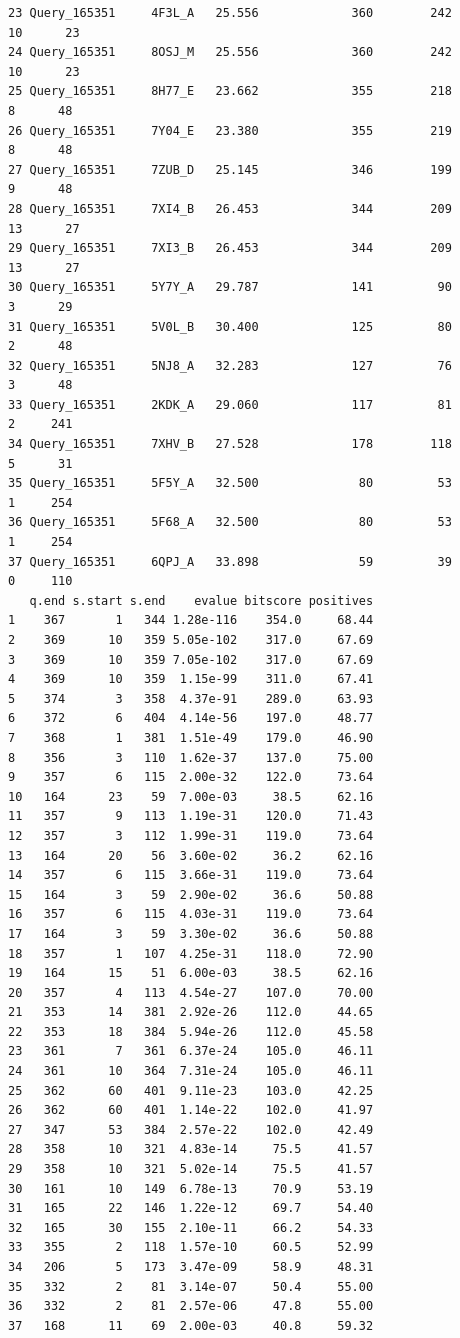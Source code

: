 \documentclass[
  letterpaper,
  DIV=11,
  numbers=noendperiod]{scrartcl}
\begin{document}
\begin{verbatim}
23 Query_165351     4F3L_A   25.556             360        242       10      23
24 Query_165351     8OSJ_M   25.556             360        242       10      23
25 Query_165351     8H77_E   23.662             355        218        8      48
26 Query_165351     7Y04_E   23.380             355        219        8      48
27 Query_165351     7ZUB_D   25.145             346        199        9      48
28 Query_165351     7XI4_B   26.453             344        209       13      27
29 Query_165351     7XI3_B   26.453             344        209       13      27
30 Query_165351     5Y7Y_A   29.787             141         90        3      29
31 Query_165351     5V0L_B   30.400             125         80        2      48
32 Query_165351     5NJ8_A   32.283             127         76        3      48
33 Query_165351     2KDK_A   29.060             117         81        2     241
34 Query_165351     7XHV_B   27.528             178        118        5      31
35 Query_165351     5F5Y_A   32.500              80         53        1     254
36 Query_165351     5F68_A   32.500              80         53        1     254
37 Query_165351     6QPJ_A   33.898              59         39        0     110
   q.end s.start s.end    evalue bitscore positives
1    367       1   344 1.28e-116    354.0     68.44
2    369      10   359 5.05e-102    317.0     67.69
3    369      10   359 7.05e-102    317.0     67.69
4    369      10   359  1.15e-99    311.0     67.41
5    374       3   358  4.37e-91    289.0     63.93
6    372       6   404  4.14e-56    197.0     48.77
7    368       1   381  1.51e-49    179.0     46.90
8    356       3   110  1.62e-37    137.0     75.00
9    357       6   115  2.00e-32    122.0     73.64
10   164      23    59  7.00e-03     38.5     62.16
11   357       9   113  1.19e-31    120.0     71.43
12   357       3   112  1.99e-31    119.0     73.64
13   164      20    56  3.60e-02     36.2     62.16
14   357       6   115  3.66e-31    119.0     73.64
15   164       3    59  2.90e-02     36.6     50.88
16   357       6   115  4.03e-31    119.0     73.64
17   164       3    59  3.30e-02     36.6     50.88
18   357       1   107  4.25e-31    118.0     72.90
19   164      15    51  6.00e-03     38.5     62.16
20   357       4   113  4.54e-27    107.0     70.00
21   353      14   381  2.92e-26    112.0     44.65
22   353      18   384  5.94e-26    112.0     45.58
23   361       7   361  6.37e-24    105.0     46.11
24   361      10   364  7.31e-24    105.0     46.11
25   362      60   401  9.11e-23    103.0     42.25
26   362      60   401  1.14e-22    102.0     41.97
27   347      53   384  2.57e-22    102.0     42.49
28   358      10   321  4.83e-14     75.5     41.57
29   358      10   321  5.02e-14     75.5     41.57
30   161      10   149  6.78e-13     70.9     53.19
31   165      22   146  1.22e-12     69.7     54.40
32   165      30   155  2.10e-11     66.2     54.33
33   355       2   118  1.57e-10     60.5     52.99
34   206       5   173  3.47e-09     58.9     48.31
35   332       2    81  3.14e-07     50.4     55.00
36   332       2    81  2.57e-06     47.8     55.00
37   168      11    69  2.00e-03     40.8     59.32


\end{verbatim}
\end{document}
